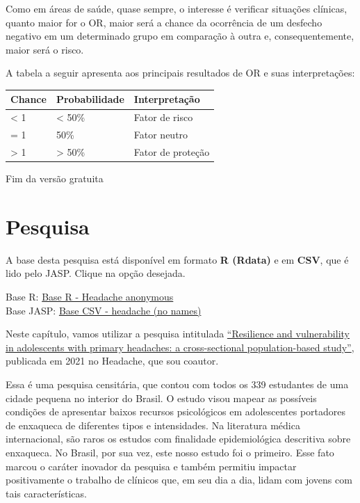 \documentclass[
]{book}
\newenvironment{base}{
  \definecolor{shadecolor}{rgb}{0.764,0.992,0.686}  %
  \color{black}
  \begin{shaded}}
 {\end{shaded}}
\begin{document}
Como em áreas de saúde, quase sempre, o interesse é verificar situações clínicas, quanto maior for o OR, maior será a chance da ocorrência de um desfecho negativo em um determinado grupo em comparação à outra e, consequentemente, maior será o risco.

A tabela a seguir apresenta aos principais resultados de OR e suas interpretações:

\begin{longtable}[]{@{}lll@{}}
\toprule
Chance & Probabilidade & Interpretação \\
\midrule
\endhead
\textless{} 1 & \textless{} 50\% & Fator de risco \\
= 1 & 50\% & Fator neutro \\
\textgreater{} 1 & \textgreater{} 50\% & Fator de proteção \\
\bottomrule
\end{longtable}

Fim da versão gratuita

\hypertarget{pesquisa-11}{%
\section{Pesquisa}\label{pesquisa-11}}

\begin{base}
A base desta pesquisa está disponível em formato \textbf{R (Rdata)} e em \textbf{CSV}, que é lido pelo JASP. Clique na opção desejada.

Base R: \href{https://github.com/anovabr/mqt/raw/master/bases/Base\%20R\%20-\%20Headache\%20anonymous.RData}{Base R - Headache anonymous}\\
Base JASP: \href{https://github.com/anovabr/mqt/raw/master/bases/bases_csv_jasp.zip}{Base CSV - headache (no names)}

\end{base}

Neste capítulo, vamos utilizar a pesquisa intitulada \href{www.google.com}{``Resilience and vulnerability in adolescents with primary headaches: a cross-sectional population-based study''}, publicada em 2021 no Headache, que sou coautor.

Essa é uma pesquisa censitária, que contou com todos os 339 estudantes de uma cidade pequena no interior do Brasil. O estudo visou mapear as possíveis condições de apresentar baixos recursos psicológicos em adolescentes portadores de enxaqueca de diferentes tipos e intensidades. Na literatura médica internacional, são raros os estudos com finalidade epidemiológica descritiva sobre enxaqueca. No Brasil, por sua vez, este nosso estudo foi o primeiro. Esse fato marcou o caráter inovador da pesquisa e também permitiu impactar positivamente o trabalho de clínicos que, em seu dia a dia, lidam com jovens com tais características.
\end{document}
